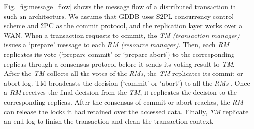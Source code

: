 \documentclass[conference]{IEEEtran}
\begin{document}
Fig.    \ref{fig:message_flow} shows the message flow of a distributed transaction in such an architecture. We assume that
GDDB uses S2PL concurrency control scheme and 2PC as the commit protocol, and the replication layer works over a WAN.
When a transaction requests to commit, the \emph{TM (transaction manager)} issues a `prepare' message to each \emph{RM (resource manager)}.
Then, each \emph{RM} replicates its vote (`prepare commit' or `prepare abort') to the corresponding replicas through a consensus protocol before it
sends its voting result to \emph{TM}.
After the \emph{TM} collects all the votes of the \emph{RMs}, the \emph{TM} replicates its commit or abort log.
TM broadcasts the decision (`commit' or `abort') to all the \emph{RMs}
.
Once a \emph{RM} receives the final decision from the \emph{TM}, it replicates the decision to the corresponding replicas.
After the consensus of commit or abort reaches, the \emph{RM}
can release the locks it had retained over the accessed data.
Finally, \emph{TM} replicate an end log to finish the transaction and clean the transaction context.


\begin{table}[tbp]
  \centering
  \caption{network message RTT on Alibaba ECS}

\label{tbl:network_rtt}
\end{table}
\end{document}
